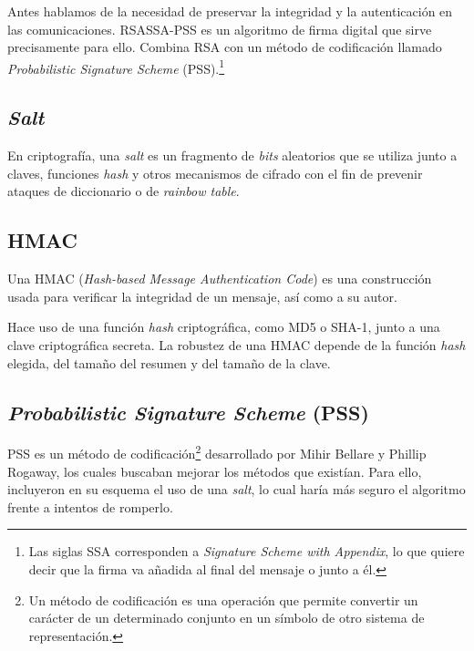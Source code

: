\label{RSASSA-PSS}

Antes hablamos de la necesidad de preservar la integridad y la autenticación en las comunicaciones. RSASSA-PSS es un algoritmo de firma digital que sirve precisamente para ello. Combina RSA con un método de codificación llamado \emph{Probabilistic Signature Scheme} (PSS).\footnote{Las siglas SSA corresponden a \emph{Signature Scheme with Appendix}, lo que quiere decir que la firma va añadida al final del mensaje o junto a él.}

\subsection{\emph{Salt}}

En criptografía, una \emph{salt} es un fragmento de \emph{bits} aleatorios que se utiliza junto a claves, funciones \emph{hash} y otros mecanismos de cifrado con el fin de prevenir ataques de diccionario o de \emph{rainbow table}. \emph{\parencite{Reference32}}

\subsection{HMAC}

\label{HMAC}

Una HMAC (\emph{Hash-based Message Authentication Code}) es una construcción usada para verificar la integridad de un mensaje, así como a su autor.

Hace uso de una función \emph{hash} criptográfica, como MD5 o SHA-1, junto a una clave criptográfica secreta. La robustez de una HMAC depende de la función \emph{hash} elegida, del tamaño del resumen y del tamaño de la clave. \emph{\parencite{Reference31}}

\subsection{\emph{Probabilistic Signature Scheme} (PSS)}

\label{PSS}

PSS es un método de codificación\footnote{Un método de codificación es una operación que permite convertir un carácter de un determinado conjunto en un símbolo de otro sistema de representación.} desarrollado por Mihir Bellare y Phillip Rogaway, los cuales buscaban mejorar los métodos que existían. Para ello, incluyeron en su esquema el uso de una \emph{salt}, lo cual haría más seguro el algoritmo frente a intentos de romperlo. \emph{\parencite{Reference15}}

